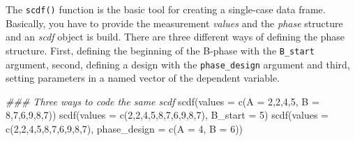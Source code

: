 \documentclass[
  letterpaper,
  DIV=11,
  numbers=noendperiod]{scrreprt}
\newenvironment{Shaded}{\begin{snugshade}}{\end{snugshade}}
\newcommand{\AttributeTok}[1]{\textcolor[rgb]{0.40,0.45,0.13}{#1}}
\newcommand{\DecValTok}[1]{\textcolor[rgb]{0.68,0.00,0.00}{#1}}
\newcommand{\DocumentationTok}[1]{\textcolor[rgb]{0.37,0.37,0.37}{\textit{#1}}}
\newcommand{\FunctionTok}[1]{\textcolor[rgb]{0.28,0.35,0.67}{#1}}
\newcommand{\NormalTok}[1]{\textcolor[rgb]{0.00,0.23,0.31}{#1}}
\begin{document}
The \texttt{scdf()} function is the basic tool for creating a
single-case data frame. Basically, you have to provide the measurement
\emph{values} and the \emph{phase} structure and an \emph{scdf} object
is build. There are three different ways of defining the phase
structure. First, defining the beginning of the B-phase with the
\texttt{B\_start} argument, second, defining a design with the
\texttt{phase\_design} argument and third, setting parameters in a named
vector of the dependent variable.

\begin{Shaded}
\begin{Highlighting}[]
\DocumentationTok{\#\#\# Three ways to code the same scdf}
\FunctionTok{scdf}\NormalTok{(}\AttributeTok{values =} \FunctionTok{c}\NormalTok{(}\AttributeTok{A =} \DecValTok{2}\NormalTok{,}\DecValTok{2}\NormalTok{,}\DecValTok{4}\NormalTok{,}\DecValTok{5}\NormalTok{, }\AttributeTok{B =} \DecValTok{8}\NormalTok{,}\DecValTok{7}\NormalTok{,}\DecValTok{6}\NormalTok{,}\DecValTok{9}\NormalTok{,}\DecValTok{8}\NormalTok{,}\DecValTok{7}\NormalTok{))}
\FunctionTok{scdf}\NormalTok{(}\AttributeTok{values =} \FunctionTok{c}\NormalTok{(}\DecValTok{2}\NormalTok{,}\DecValTok{2}\NormalTok{,}\DecValTok{4}\NormalTok{,}\DecValTok{5}\NormalTok{,}\DecValTok{8}\NormalTok{,}\DecValTok{7}\NormalTok{,}\DecValTok{6}\NormalTok{,}\DecValTok{9}\NormalTok{,}\DecValTok{8}\NormalTok{,}\DecValTok{7}\NormalTok{), }\AttributeTok{B\_start =} \DecValTok{5}\NormalTok{)}
\FunctionTok{scdf}\NormalTok{(}\AttributeTok{values =} \FunctionTok{c}\NormalTok{(}\DecValTok{2}\NormalTok{,}\DecValTok{2}\NormalTok{,}\DecValTok{4}\NormalTok{,}\DecValTok{5}\NormalTok{,}\DecValTok{8}\NormalTok{,}\DecValTok{7}\NormalTok{,}\DecValTok{6}\NormalTok{,}\DecValTok{9}\NormalTok{,}\DecValTok{8}\NormalTok{,}\DecValTok{7}\NormalTok{), }\AttributeTok{phase\_design =} \FunctionTok{c}\NormalTok{(}\AttributeTok{A =} \DecValTok{4}\NormalTok{, }\AttributeTok{B =} \DecValTok{6}\NormalTok{))}
\end{Highlighting}
\end{Shaded}
\end{document}
